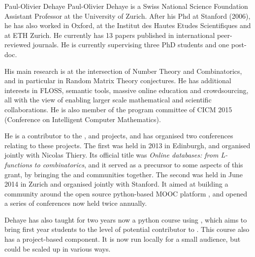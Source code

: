 \begin{participant}[type=leadPI,PM=6,gender=male]{Paul-Olivier Dehaye}
  Paul-Olivier Dehaye is a Swiss National Science Foundation Assistant Professor at the
  University of Zurich. After his Phd at Stanford (2006), he has also worked in Oxford, at
  the Institut des Hautes Etudes Scientifiques and at ETH Zurich. He currently has 13
  papers published in international peer-reviewed journals. He is currently supervising
  three PhD students and one post-doc.

  His main research is at the intersection of Number Theory and Combinatorics, and in
  particular in Random Matrix Theory conjectures. He has additional interests in FLOSS,
  semantic tools, massive online education and crowdsourcing, all with the view of
  enabling larger scale mathematical and scientific collaborations. He is also member of
  the program committee of CICM 2015 (Conference on Intelligent Computer Mathematics).

  He is a contributor to the \Sage, \LMFDB and \OpenEdX projects, and has organised two
  conferences relating to these projects. The first was held in 2013 in Edinburgh, and
  organised jointly with Nicolas Thiery. Its official title was \emph{Online databases:
    from L-functions to combinatorics}, and it served as a precursor to some aspects of
  this grant, by bringing the \SageCombinat and \LMFDB communities together.  The second
  was held in June 2014 in Zurich and organised jointly with Stanford. It aimed at
  building a community around the open source python-based MOOC platform \OpenEdX, and
  opened a series of conferences now held twice annually.

  Dehaye has also taught for two years now a python course using \OpenEdX, which aims to
  bring first year students to the level of potential contributor to \Sage. This course
  also has a project-based component. It is now run locally for a small audience, but
  could be scaled up in various ways.
\end{participant}


